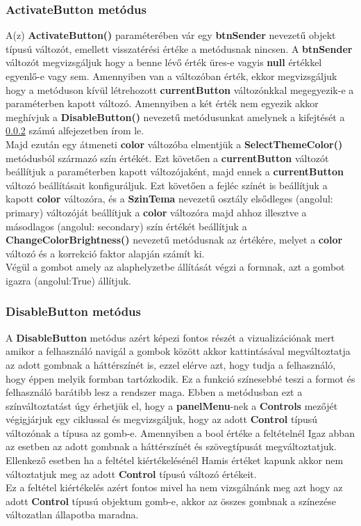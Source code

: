 \documentclass[tocnopagenum]{thesis-ekf}
\theoremstyle{definition}
\theoremstyle{remark}
\begin{document}
	\subsubsection{ActivateButton metódus}
	A(z) \textbf{ActivateButton()} paraméterében vár egy \textbf{btnSender} nevezetű objekt típusú változót, emellett visszatérési értéke a metódusnak nincsen. A \textbf{btnSender} változót megvizsgáljuk hogy a benne lévő érték üres-e vagyis \textbf{null} értékkel egyenlő-e vagy sem. Amennyiben van a változóban érték, ekkor megvizsgáljuk hogy a metóduson kívül létrehozott \textbf{currentButton} változónkkal megegyezik-e a paraméterben kapott változó. Amennyiben a két érték nem egyezik akkor meghívjuk a \textbf{DisableButton()} nevezetű metódusunkat amelynek a kifejtését a \ref{Disablebuttonlabel} számú alfejezetben írom le.
	\\
	 Majd ezután egy átmeneti \textbf{color} változóba elmentjük a \textbf{SelectThemeColor()} metódusból származó szín értékét. Ezt követően a \textbf{currentButton} változót beállítjuk a paraméterben kapott változójaként, majd ennek a \textbf{currentButton} változó beállításait konfiguráljuk. Ezt követően a fejléc színét is beállítjuk a kapott \textbf{color} változóra, és a \textbf{SzinTema} nevezetű osztály elsődleges (angolul: primary) változóját beállítjuk a \textbf{color} változóra majd ahhoz illesztve a másodlagos (angolul: secondary) szín értékét beállítjuk a \textbf{ChangeColorBrightness()} nevezetű metódusnak az értékére, melyet a \textbf{color} változó és a korrekció faktor alapján számít ki.
	 \\
	 Végül a gombot amely az alaphelyzetbe állítását végzi a formnak, azt a gombot igazra (angolul:True) állítjuk.
	\subsubsection{DisableButton metódus}
	\label{Disablebuttonlabel}
	A \textbf{DisableButton} metódus azért képezi fontos részét a vizualizációnak mert amikor a felhasználó navigál a gombok között akkor kattintásával megváltoztatja az adott gombnak a háttérszínét is, ezzel elérve azt, hogy tudja a felhasználó, hogy éppen melyik formban tartózkodik. Ez a funkció színesebbé teszi a formot és felhasználó barátibb lesz a rendszer maga. Ebben a metódusban ezt a színváltoztatást úgy érhetjük el, hogy a \textbf{panelMenu}-nek a \textbf{Controls} mezőjét végigjárjuk egy ciklussal és megvizsgáljuk, hogy az adott \textbf{Control} típusú változónak a típusa az gomb-e.
	Amennyiben a bool értéke a feltételnél Igaz abban az esetben az adott gombnak a háttérszínét és szövegtípusát megváltoztatjuk.
	\\
	Ellenkező esetben ha a feltétel kiértékelésénél Hamis értéket kapunk akkor nem változtatjuk meg az adott \textbf{Control} típusú változó értékeit.
	\\ 
	Ez a feltétel kiértékelés azért fontos mivel ha nem vizsgálnánk meg azt hogy az adott \textbf{Control} típusú objektum gomb-e, akkor az összes gombnak a színezése változatlan állapotba maradna.
\end{document}
